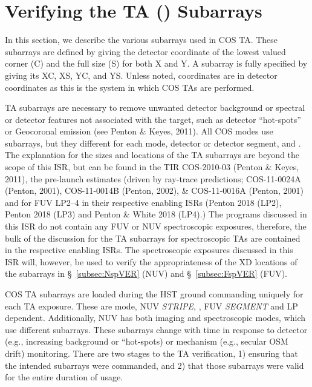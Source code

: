 \section{Verifying the TA (\tacq{}) Subarrays}\label{sec:subarray}
In this section, we describe the various subarrays used in COS TA.
These subarrays are defined by giving the detector coordinate of the lowest valued corner (C) and the full size (S) for both X and Y.
A subarray is fully specified by giving its XC, XS, YC, and YS. Unless noted, coordinates are in detector coordinates as this is the system in which COS TAs are performed.

TA subarrays are necessary to remove unwanted detector background or spectral or detector features not associated with the target, such as detector
``hot-spots'' or Geocoronal emission (see Penton \& Keyes, 2011). All COS \tacq{} modes use subarrays, but they different for each mode, detector or detector segment,
and \cenwave{}.  The explanation for the sizes and locations of the TA subarrays are beyond the scope of this ISR, but can be found in the TIR COS-2010-03 (Penton \& Keyes, 2011),
the pre-launch estimates (driven by ray-trace predictions; COS-11-0024A (Penton, 2001), COS-11-0014B (Penton, 2002), \& COS-11-0016A (Penton, 2001) and for
FUV LP2--4 in their respective enabling ISRs (Penton 2018 (LP2), Penton 2018 (LP3) and Penton \& White 2018 (LP4).)
The programs discussed in this ISR do not contain any FUV or NUV spectroscopic \tacq{} exposures, therefore, the bulk of the discussion for the TA subarrays for
spectroscopic TAs are contained in the respective enabling ISRs. The spectroscopic exposures discussed in this ISR will, however, be used to verify
the appropriateness of the XD locations of the subarrays in \S~\ref{subsec:NspVER} (NUV) and \S~\ref{subsec:FspVER} (FUV).

COS TA subarrays are loaded during the HST ground commanding uniquely for each TA exposure.
These are \tacq{} mode, NUV \textit{STRIPE}, \cenwave{}, FUV \textit{SEGMENT} and LP dependent.
Additionally, NUV  has both imaging and spectroscopic modes, which use different subarrays.
These subarrays change with time in response to detector (e.g., increasing background or ``hot-spots)
or mechanism (e.g., secular OSM drift) monitoring.
There are two stages to the TA verification,
1) ensuring that the intended subarrays were commanded, and
2) that those subarrays were valid for the entire duration of usage.

